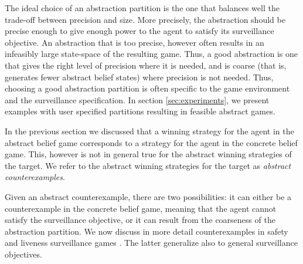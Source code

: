 The ideal choice of an abstraction partition is the one that balances well the trade-off between precision and size. More precisely, the abstraction should be precise enough to give enough power to the agent to satisfy its surveillance objective. An abstraction that is too precise, however often results in an infeasibly large state-space of the resulting game. Thus, a good abstraction is one that gives the right level of precision where it is needed, and is coarse (that is, generates fewer abstract belief states) where precision is not needed. Thus, choosing a good abstraction partition is often specific to the game environment and the surveillance specification. In section \ref{sec:experiments}, we present  examples with user specified partitions resulting in feasible  abstract games.

In the previous section we discussed that a winning strategy for the agent in the abstract belief game corresponds to a strategy for the agent in the concrete belief game. This, however is not in general true for the abstract winning strategies of the target. We refer to the abstract winning  strategies for the target as \emph{abstract counterexamples}.

Given an abstract counterexample, there are two possibilities: it can either be a counterexample in the concrete belief game, meaning that the agent cannot satisfy the surveillance objective, or it can result from the coarseness of the abstraction partition. We now discuss in more detail counterexamples in safety and liveness surveillance games . The latter generalize also to general surveillance objectives.
